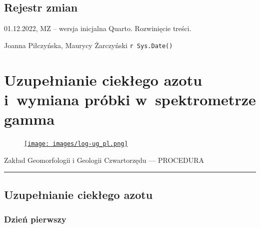 \documentclass[
  letterpaper,
  DIV=11,
  numbers=noendperiod]{scrreprt}
\begin{document}
\hypertarget{rejestr-zmian-6}{%
\section{Rejestr zmian}\label{rejestr-zmian-6}}

01.12.2022, MZ -- wersja inicjalna Quarto. Rozwinięcie treści.

Joanna Piłczyńska, Maurycy Żarczyński \texttt{r\ Sys.Date()}

\hypertarget{uzupeux142nianie-ciekux142ego-azotu-i-wymiana-pruxf3bki-w-spektrometrze-gamma}{%
\chapter{Uzupełnianie ciekłego azotu i~wymiana próbki w~spektrometrze
gamma}\label{uzupeux142nianie-ciekux142ego-azotu-i-wymiana-pruxf3bki-w-spektrometrze-gamma}}

\begin{figure}

\href{https://geomorfologia.ug.edu.pl}{\texttt{[image: images/log-ug\_pl.png]}}

\end{figure}

Zakład Geomorfologii i Geologii Czwartorzędu --- PROCEDURA

\begin{center}\rule{0.5\linewidth}{0.5pt}\end{center}

\hypertarget{uzupeux142nianie-ciekux142ego-azotu}{%
\section{Uzupełnianie ciekłego
azotu}\label{uzupeux142nianie-ciekux142ego-azotu}}

\hypertarget{dzieux144-pierwszy-1}{%
\subsection{Dzień pierwszy}\label{dzieux144-pierwszy-1}}
\end{document}
